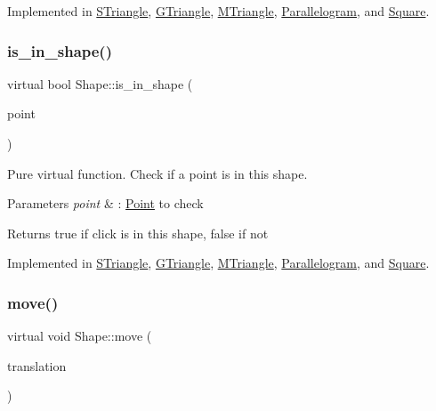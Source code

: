 Implemented in \hyperlink{classSTriangle_a08f667453619b506b5c16745a9aa5ecf}{S\+Triangle}, \hyperlink{classGTriangle_add4581d1b52836142de5817de4d52d17}{G\+Triangle}, \hyperlink{classMTriangle_a90351a097a20d35f9d6c4d05ad881e48}{M\+Triangle}, \hyperlink{classParallelogram_a17c9986712806a8b07d90e444e0a543d}{Parallelogram}, and \hyperlink{classSquare_a2a8fb1bfd2f3464cee813ec8b277506e}{Square}.

\mbox{\label{classShape_abcce23128cd35989468a88a7194152af}} 
\subsubsection{\texorpdfstring{is\+\_\+in\+\_\+shape()}{is\_in\_shape()}}
{\footnotesize\ttfamily virtual bool Shape\+::is\+\_\+in\+\_\+shape (\begin{DoxyParamCaption}\item[{\hyperlink{classPoint}{Point}$<$ double $>$}]{point }\end{DoxyParamCaption})\hspace{0.3cm}{\ttfamily [pure virtual]}}



Pure virtual function. Check if a point is in this shape. 


\begin{DoxyParams}{Parameters}
{\em point} & \+: \hyperlink{classPoint}{Point} to check \\
\hline
\end{DoxyParams}
\begin{DoxyReturn}{Returns}
true if click is in this shape, false if not 
\end{DoxyReturn}


Implemented in \hyperlink{classSTriangle_a122eba5ec56c5f1707d53aea5be0b69c}{S\+Triangle}, \hyperlink{classGTriangle_a7e5d4eefbb2e42b9c3142096a23dcb19}{G\+Triangle}, \hyperlink{classMTriangle_a8d3d737a903823bf1a631cbb004a799c}{M\+Triangle}, \hyperlink{classParallelogram_a9ba441d86d6311bba489e998c87dddf6}{Parallelogram}, and \hyperlink{classSquare_a18b130131d969c53f3dfbe2b753a28d4}{Square}.

\mbox{\label{classShape_a52649731b2cb7b67315882d5e005f7e8}} 
\subsubsection{\texorpdfstring{move()}{move()}}
{\footnotesize\ttfamily virtual void Shape\+::move (\begin{DoxyParamCaption}\item[{\hyperlink{classPoint}{Point}$<$ double $>$}]{translation }\end{DoxyParamCaption})\hspace{0.3cm}{\ttfamily [pure virtual]}}



